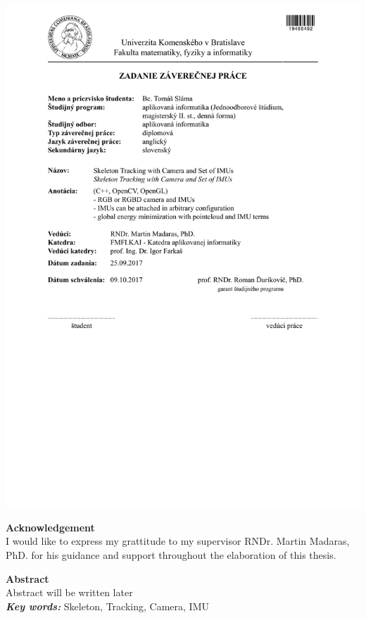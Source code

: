 \documentclass[12pt,a4paper]{report}
\theoremstyle{definition}
\theoremstyle{remark}
\begin{document}
\newpage
\thispagestyle{empty}
\includegraphics[width=\textwidth]{dip.pdf}



\flushleft\textbf{\Huge Acknowledgement}\\ \hfill \break
\justify %
I would like to express my grattitude to my supervisor RNDr.  Martin Madaras, PhD. for his guidance and support throughout the elaboration of this thesis.
\setcounter{page}{1}
\newpage


\flushleft\textbf{\Huge Abstract}\\ \hfill \break
\justify %
	Abstract will be written later \\ \newline
\textbf{\textit{Key words: }}Skeleton, Tracking, Camera, IMU
\end{document}
